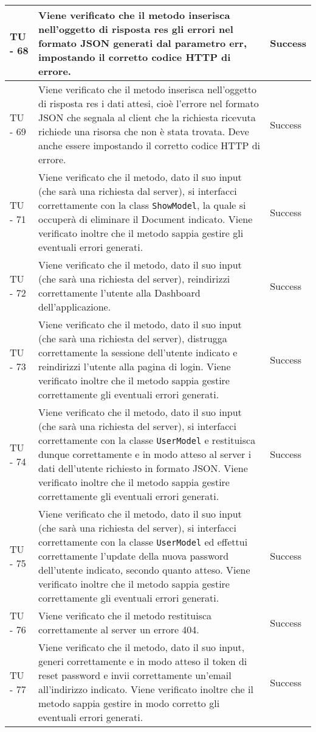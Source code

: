 \begin{center}
\begin{longtable}{ | p{3cm} | p{9cm} | p{2cm} | }
TU - 68 & Viene verificato che il metodo inserisca nell'oggetto di risposta res gli errori nel formato JSON generati dal parametro err, impostando il corretto codice HTTP di errore. & Success \\ \hline
TU - 69 & Viene verificato che il metodo inserisca nell'oggetto di risposta res i dati attesi, cioè l'errore nel formato JSON che segnala al client che la richiesta ricevuta richiede una risorsa che non è stata trovata. Deve anche essere impostando il corretto codice HTTP di errore. & Success \\ \hline
TU - 71 & Viene verificato che il metodo, dato il suo input (che sarà una richiesta dal server), si interfacci correttamente con la class \texttt{ShowModel}, la quale si  occuperà di eliminare il Document indicato. Viene verificato inoltre che il metodo sappia gestire gli eventuali errori generati. & Success \\ \hline
TU - 72 & Viene verificato che il metodo, dato il suo input (che sarà una richiesta del server), reindirizzi correttamente l'utente alla Dashboard dell'applicazione. & Success \\ \hline
TU - 73 & Viene verificato che il metodo, dato il suo input (che sarà una richiesta del server), distrugga correttamente la sessione dell'utente indicato e reindirizzi l'utente alla pagina di login. Viene verificato inoltre che il metodo sappia gestire correttamente gli eventuali errori generati. & Success \\ \hline
TU - 74 & Viene verificato che il metodo, dato il suo input (che sarà una richiesta del server), si interfacci correttamente con la classe \texttt{UserModel} e restituisca dunque correttamente e in modo atteso al server i dati dell'utente richiesto in formato JSON. Viene verificato inoltre che il metodo sappia gestire correttamente gli eventuali errori generati. & Success \\ \hline
TU - 75 & Viene verificato che il metodo, dato il suo input (che sarà una richiesta del server), si interfacci correttamente con la classe \texttt{UserModel} ed effettui correttamente l'update della nuova password dell'utente indicato, secondo quanto atteso. Viene verificato inoltre che il metodo sappia gestire correttamente gli eventuali errori generati. & Success \\ \hline
TU - 76 & Viene verificato che il metodo restituisca correttamente al server un errore 404. & Success \\ \hline
TU - 77 & Viene verificato che il metodo, dato il suo input, generi correttamente e in modo atteso il token di reset password e invii correttamente un'email all'indirizzo indicato. Viene verificato inoltre che il metodo sappia gestire in modo corretto gli eventuali errori generati. & Success \\ \hline

\end{longtable}
\end{center}
